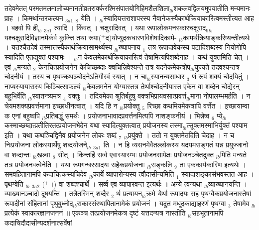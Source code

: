 \documentclass[article,12pt,a4paper]{memoir}%
\newcommand{\add}[1]{($^{+}$#1)}
\begin{document}
	  
	  \pstart \leavevmode%
	तदेवमेतत् परमतमलमालोच्यमानतीव्रतरार्क्करश्मिसंपातयोगिहिमशैलशिला{\tiny $_{lb}$}शकलवद्विलयमुपयातीति मन्यमानः प्राह । {\color{DodgerBlue3}किमर्थान्तरकल्पन} {\tiny $_{3a1}$} {\tiny $_{8}$} येति । {\tiny $_{lb}$}स्यादियत्तराशापरस्य नैवानेकस्यैकार्थक्रियाकारित्वमस्तीत्यत आह । {\color{DodgerBlue3}बहवो} पि ही{\tiny $_{lb}$} {\tiny $_{3a1}$} {\color{DodgerBlue3}त्यादि} । किंवत् । चक्षुरादिवत् । यथा रूपालोकमनस्कारचक्षुराद{\tiny $_{9}$}{\tiny $_{lb}$}\leavevmode{} \leavevmode{}यश्चक्षुरादिविज्ञानमेकंर्व कुव्न्ति तथा रूपा\add{द}योप्युदकधारणविशेषादिकामे- {\tiny $_{lb}$}कामर्थक्रियाङ्करिष्यन्तीत्यर्थः । यतश्चैतदेवं तस्मात्तस्यैकार्थक्रियासामर्थ्यस्य {\tiny $_{lb}$}ख्यापनाय {\tiny $_{1}$} तत्र रूपादावेकस्य पटादिशब्दस्य नियोगोपि स्यादिति एतद्युक्तं पश्यामः । {\tiny $_{lb}$}न केवलमेकार्थक्रियाकारित्वं तेषामित्यपिशब्देनाह । कथं युक्तमिति चेत् । एवं {\tiny $_{lb}$}मन्यते {\tiny $_{2}$} केनचित्प्रयोजनेन केचिच्छब्दाः क्वचिन्निवेश्यन्ते तत्र यदनेकमेकत्रोप{\tiny $_{lb}$}युज्यते तदवश्यन्तत्र चोदनीयं । तस्य च पृथक्कथञ्चोदनेऽतिगौरवं स्यात् । न चा{\tiny $_{lb}$}स्यानन्यसाधार {\tiny $_{3}$} णं रूपं शक्यं चोदयितुं । नाप्यस्यायासस्य किञ्चित्साफल्यं {\tiny $_{lb}$}केवलमनेन योग्यास्तत्र तेर्थाश्चोदनीयास्त एकेन वा शब्देन चोद्येरन् बहुभिर्वेति {\tiny $_{lb}$}स्वातन्त्र्यमत्र {\tiny $_{4}$} वक्तुः । तदियमेका श्रुतिर्बहुषु वक्त्रभिप्रायवसात्प्रवर्त्त{\tiny $_{lb}$}माना नोपालम्भमर्हति । न चेयमशक्यप्रवर्त्तमाना इच्छाधीनत्वात् । यदि हि न {\tiny $_{lb}$}प्रयोक्तु {\tiny $_{5}$} रिच्छा कथमियमेकत्रापि वर्त्तेत । इच्छायाम्वा क एनां बहुष्वपि {\tiny $_{lb}$}प्रतिबद्धुं समर्थः । प्रयोजनाभावादप्रवर्त्तनमित्यपि नाशङ्कनीयं । भिन्नेष्व {\tiny $_{6}$} प्ये{\tiny $_{lb}$}कस्माच्छब्दात्प्रतीतिरतत्प्रयोजनभेदेन यथा स्यादित्युक्तत्वात् प्रयोजनस्य तस्मा{\tiny $_{lb}$}त्सूक्तमस्माभिर्युक्तं पश्याम इति । यथा कथञ्चिद्विनैव प्रयोजनेन लोकः शब्दं {\tiny $_{7}$} {\tiny $_{lb}$}प्रयुंक्ते । ततो न युक्तमेतदिति चेदाह । न च {\color{DodgerBlue3}निःप्रयोजना लोकस्यार्थेषु} शब्दयोजने{\tiny $_{lb}$} {\tiny $_{3a1}$} ति । न हि व्यसनमेवैतल्लोकस्य यदयमसङ्गतं यन्न प्रयुज्जानो वा शब्दान्तः {\tiny $_{lb}$}खल्वा {\tiny $_{8}$} सीत् । किन्तर्हि सर्व्व एवास्यारम्भः प्रयोजनसापेक्षः प्रयोजनञ्चेतदुक्त {\tiny $_{lb}$}मिति मन्यते तत्र प्रयोजनवत्वेनेति । यथा रूपगन्धरसादयः सहैकप्रयोजनाः {\tiny $_{lb}$}सङ्कलि {\tiny $_{9}$} \leavevmode{} ता एककार्यकारिण इत्यर्थः । समवहितानामपि कदाचित्कस्यचिदेव {\tiny $_{lb}$}कार्ये व्यापारोन्यस्य त्वौदासीन्यमिति {\tiny $_{1}$} स्यादाशङ्कासंभवस्तत आह । {\color{DodgerBlue3}पृथग्वेति} {\tiny $_{lb}$} {\tiny $_{3a2}$} \add{।} वा शब्दश्चार्थे । सर्व्व एव व्यापारवन्त इत्यर्थः । अन्ये त्वन्यथा {\tiny $_{lb}$}व्याख्यानयन्ति । व्याख्यानञ्चादो दूषयन्ति । तत्रैतस्मिन् शब्दैर {\tiny $_{2}$} र्थ प्रत्यायन{\tiny $_{lb}$}क्रमे येर्था रूपादयः सह पृथग्वैकप्रयोजनास्तेषां रूपादीनां संहितानां पृथुबुध्नोद{\tiny $_{lb}$}राकारसंस्थापितानामेकं प्रयोजनं । यदुत मधूदकाद्याहरणं पृथग्वा {\tiny $_{3}$} तेषामेव {\tiny $_{lb}$}प्रत्येकं स्वाकारज्ञानजननं ॥ एकञ्च तत्प्रयोजनमेकत्र दृष्टं यत्तदन्यत्र नास्तीति {\tiny $_{lb}$}सहभूतानामपि कदाचिदौदासीन्यदर्शनात्सर्वेषां 
\end{document}
